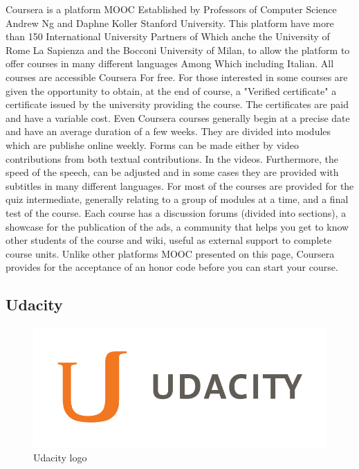 Coursera is a platform MOOC Established by Professors of Computer Science Andrew Ng and Daphne Koller Stanford University. This platform have more than 150 International  University Partners of Which anche the University of Rome La Sapienza and the Bocconi University of Milan, to allow the platform to offer courses in many different languages Among Which including Italian. All courses are accessible Coursera For free.
For those interested in some courses are given the opportunity to obtain, at the end of course, a "Verified certificate" a certificate issued by the university providing the course. The certificates are paid and have a variable cost.
Even Coursera courses generally begin at a precise date and have an average duration of a few weeks. They are divided into modules which are publishe online weekly. Forms can be made either by video contributions from both textual contributions. In the videos. Furthermore, the speed of the speech, can be adjusted and in some cases they are provided with subtitles in many different languages.
For most of the courses are provided for the quiz intermediate, generally relating to a group of modules at a time, and a final test of the course.
Each course has a discussion forums (divided into sections), a showcase for the publication of the ads, a community that helps you get to know other students of the course and wiki, useful as external support to complete course units. Unlike other platforms MOOC presented on this page, Coursera provides for the acceptance of an honor code before you can start your course.

\subsection{Udacity}
\label{subsec:udacity}
\begin{figure}[htb] %
 \centering
 \includegraphics[width=1.0\linewidth]{images/chapter1/udacity.png}\hfill
 \caption[Udacity logo]{Udacity logo}
 \label{fig:fourV}
\end{figure}

